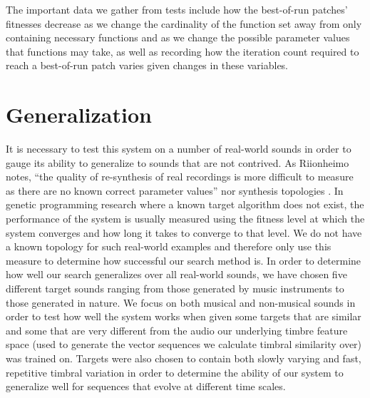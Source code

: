 \documentclass[12pt]{report} 	%
\numberwithin{figure}{chapter}
\numberwithin{table}{chapter}
\numberwithin{equation}{chapter}
\begin{document}
\begin{flushleft}
The important data we gather from tests include how the best-of-run patches' fitnesses decrease as we change the cardinality of the function set away from only containing necessary functions and as we change the possible parameter values that functions may take, as well as recording how the iteration count required to reach a best-of-run patch varies given changes in these variables.

\section{Generalization}
It is necessary to test this system on a number of real-world sounds in order to gauge its ability to generalize to sounds that are not contrived. As Riionheimo notes, ``the quality of re-synthesis of real recordings is more difficult to measure as there are no known correct parameter values'' nor synthesis topologies \cite[p. 13]{Riionheimo:2003qo}. In genetic programming research where a known target algorithm does not exist, the performance of the system is usually measured using the fitness level at which the system converges and how long it takes to converge to that level. We do not have a known topology for such real-world examples and therefore only use this measure to determine how successful our search method is. In order to determine how well our search generalizes over all real-world sounds, we have chosen five different target sounds ranging from those generated by music instruments to those generated in nature. We focus on both musical and non-musical sounds in order to test how well the system works when given some targets that are similar and some that are very different from the audio our underlying timbre feature space (used to generate the vector sequences we calculate timbral similarity over) was trained on. Targets were also chosen to contain both slowly varying and fast, repetitive timbral variation in order to determine the ability of our system to generalize well for sequences that evolve at different time scales.


\end{flushleft}
\end{document}
